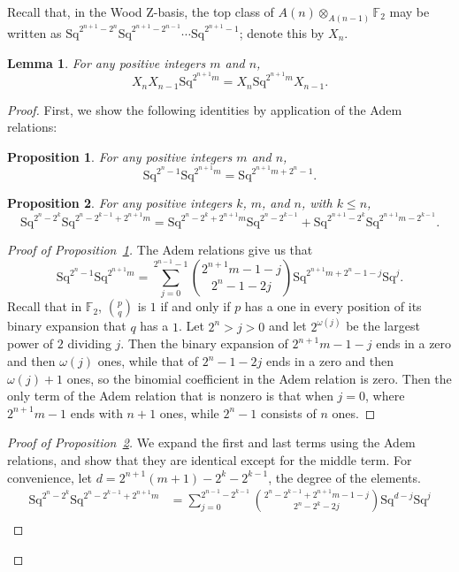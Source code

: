 \documentclass{article}
\newcommand{\F}{\mathbb{F}}
\newcommand{\Sq}{\mathrm{Sq}}
\newtheorem{prop}{Proposition}
\newtheorem{lem}{Lemma}
\begin{document}
  Recall that, in the Wood Z-basis, the top class of $A(n)\otimes_{A(n-1)}\F_2$ may be written as $\Sq^{2^{n+1}-2^n}\Sq^{2^{n+1}-2^{n-1}}\cdots\Sq^{2^{n+1}-1}$; denote this by $X_n$.

  \begin{lem}\label{lem:commutation-relation}
    For any positive integers $m$ and $n$,
    \[X_nX_{n-1}\Sq^{2^{n+1}m} = X_n\Sq^{2^{n+1}m}X_{n-1}.\]
  \end{lem}

  \begin{proof}
    First, we show the following identities by application of the Adem relations:
    \begin{prop}\label{prop:identity-1}
      For any positive integers $m$ and $n$,
      \[\Sq^{2^n-1}\Sq^{2^{n+1}m}=\Sq^{2^{n+1}m+2^n-1}.\]
    \end{prop}
    \begin{prop}\label{prop:identity-2}
      For any positive integers $k$, $m$, and $n$, with $k\leq n$,
      \[\Sq^{2^n-2^k}\Sq^{2^n-2^{k-1}+2^{n+1}m}=\Sq^{2^n-2^k+2^{n+1}m}\Sq^{2^n-2^{k-1}}+\Sq^{2^{n+1}-2^k}\Sq^{2^{n+1}m-2^{k-1}}.\]
    \end{prop}
    \begin{proof}[Proof of Proposition~\ref{prop:identity-1}]
      The Adem relations give us that
      \[\Sq^{2^n-1}\Sq^{2^{n+1}m} = \sum_{j=0}^{2^{n-1}-1}\binom{2^{n+1}m-1-j}{2^n-1-2j}\Sq^{2^{n+1}m+2^n-1-j}\Sq^j.\]
      Recall that in $\F_2$, $\binom{p}{q}$ is $1$ if and only if $p$ has a one in every position of its binary expansion that $q$ has a $1$.  Let $2^n>j>0$ and let $2^{\omega(j)}$ be the largest power of $2$ dividing $j$.  Then the binary expansion of $2^{n+1}m-1-j$ ends in a zero and then $\omega(j)$ ones, while that of $2^n-1-2j$ ends in a zero and then $\omega(j)+1$ ones, so the binomial coefficient in the Adem relation is zero.  Then the only term of the Adem relation that is nonzero is that when $j=0$, where $2^{n+1}m-1$ ends with $n+1$ ones, while $2^n-1$ consists of $n$ ones.
    \end{proof}
    \begin{proof}[Proof of Proposition~\ref{prop:identity-2}]
      We expand the first and last terms using the Adem relations, and show that they are identical except for the middle term. For convenience, let $d=2^{n+1}(m+1)-2^k-2^{k-1}$, the degree of the elements.
      \begin{align*}
        \Sq^{2^n-2^k}\Sq^{2^n-2^{k-1}+2^{n+1}m} &= \sum_{j=0}^{2^{n-1}-2^{k-1}} \binom{2^n-2^{k-1}+2^{n+1}m-1-j}{2^n-2^k-2j} \Sq^{d-j}\Sq^j \\

\end{align*}
\end{proof}
\end{proof}
\end{document}
